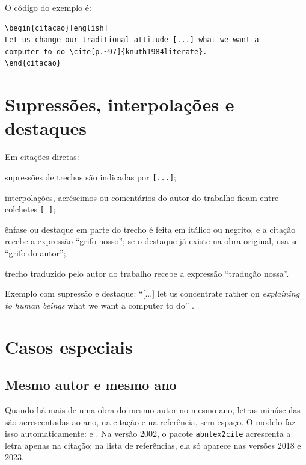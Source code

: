 O código do exemplo é:

\begin{verbatim}
\begin{citacao}[english]
Let us change our traditional attitude [...] what we want a
computer to do \cite[p.~97]{knuth1984literate}.
\end{citacao}
\end{verbatim}

\section{Supressões, interpolações e destaques}\label{sec:supressoes}

Em citações diretas:

\begin{alineas}
	\item supressões de trechos são indicadas por \texttt{[...]};
	\item interpolações, acréscimos ou comentários do autor do trabalho ficam entre colchetes \texttt{[ ]};
	\item ênfase ou destaque em parte do trecho é feita em itálico ou negrito, e a citação recebe a expressão ``grifo nosso''; se o destaque já existe na obra original, usa-se ``grifo do autor'';
	\item trecho traduzido pelo autor do trabalho recebe a expressão ``tradução nossa''.
\end{alineas}

Exemplo com supressão e destaque: ``[...] let us concentrate rather on \textit{explaining to human beings} what we want a computer to do'' \cite[p.~97, grifo nosso]{knuth1984literate}.

\section{Casos especiais}\label{sec:casos-especiais}

\subsection{Mesmo autor e mesmo ano}

Quando há mais de uma obra do mesmo autor no mesmo ano, letras minúsculas são acrescentadas ao ano, na citação e na referência, sem espaço. O modelo faz isso automaticamente: \cite{knuth1984texbook} e \cite{knuth1984literate}. Na versão 2002, o pacote \texttt{abntex2cite} acrescenta a letra apenas na citação; na lista de referências, ela só aparece nas versões 2018 e 2023.

